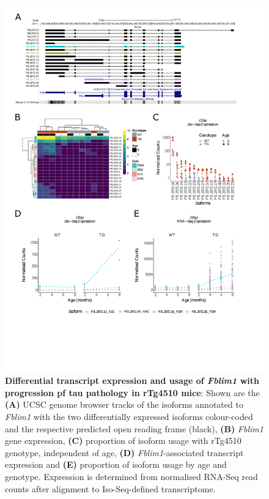 \begin{figure}[!htp]
	\centering
	\includegraphics[page=6,trim={1.5cm 3cm 2cm 1cm}, scale = 0.80]{Figures/Ch5_DiffPlots.pdf}
	\captionsetup{width=0.95\textwidth}
	\caption[Differential \textit{Fblim1} transcript expression and usage]%
	{\textbf{Differential transcript expression and usage of \textit{Fblim1} with progression pf tau pathology in rTg4510 mice}: Shown are the \textbf{(A)} UCSC genome browser tracks of the isoforms annotated to \textit{Fblim1} with the two differentially expressed isoforms colour-coded and the respective predicted open reading frame (black), \textbf{(B)} \textit{Fblim1} gene expression, \textbf{(C)} proportion of isoform usage with rTg4510 genotype, independent of age, \textbf{(D)} \textit{Fblim1}-associated transcript expression and \textbf{(E)} proportion of isoform usage by age and genotype. Expression is determined from normalised RNA-Seq read counts after alignment to Iso-Seq-defined transcriptome.} 
	\label{fig:DIU_fblim1}
\end{figure}

